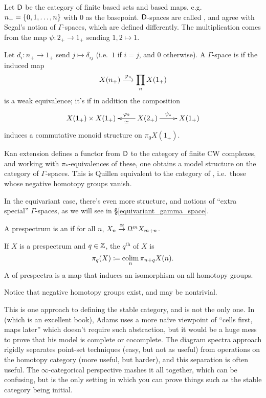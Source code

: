 \begin{exm}
\label{gamma_spaces}
Let $\mathsf D$ be the category of finite based sets and based maps, e.g.\ $n_+ = \{0,1,\dotsc,n\}$ with $0$ as the
basepoint. $\mathsf D$-spaces are called , and agree with Segal's
notion of $\Gamma$-spaces, which are defined differently. The multiplication comes from the map $\psi\colon 2_+\to
1_+$ sending $1,2\mapsto 1$.

Let $d_i:n_+\to 1_+$ send $j\mapsto\delta_{ij}$ (i.e.\ $1$ if $i = j$, and $0$ otherwise). A $\Gamma$-space is
 if the induced map
\[X(n_+)\stackrel{\varphi_n}{\longrightarrow} \prod_n X(1_+)\]
is a weak equivalence; it's  if in addition the composition
\[\xymatrix{
	X(1_+)\times X(1_+) & X(2_+)\ar[l]^-\simeq_-{\vp_2}\ar[r]^{\psi_*} &X(1_+)
}\]
induces a commutative monoid structure on $\pi_0 X(1_+)$.

Kan extension defines a functor from $\mathsf D$ to the category of finite CW complexes, and working with
$\pi_*$-equivalences of these, one obtains a model structure on the category of $\Gamma$-spaces. This is Quillen
equivalent to the category of , i.e.\ those whose negative homotopy
groups vanish.
\end{exm}
In the equivariant case, there's even more structure, and notions of ``extra special'' $\Gamma$-spaces, as we will
see in \S\ref{equivariant_gamma_space}.
\begin{defn}
A prespectrum is an  if for all $n$,
$X_n\stackrel\cong\to\Omega^mX_{m+n}$.
\end{defn}
\begin{defn}
If $X$ is a prespectrum and $q\in\mathbb Z$, the $q^{\text{th}}$ 
of $X$ is
\[\pi_q(X)\coloneqq \operatorname*{colim}_n \pi_{n+q}X(n).\]
A  of prespectra is a map that induces an
isomorphism on all homotopy groups.
\end{defn}
Notice that negative homotopy groups exist, and may be nontrivial.
\begin{rem}
This is one approach to defining the stable category, and is not the only one. In~\cite{AdamsStableHomotopy} (which
is an excellent book), Adams uses a more naïve viewpoint of ``cells first, maps later'' which doesn't require such
abstraction, but it would be a huge mess to prove that his model is complete or cocomplete. The diagram spectra
approach rigidly separates point-set techniques (easy, but not as useful) from operations on the homotopy category
(more useful, but harder), and this separation is often useful. The $\infty$-categorical perspective mashes it all
together, which can be confusing, but is the only setting in which you can prove things such as the stable
category being initial.
\end{rem}

